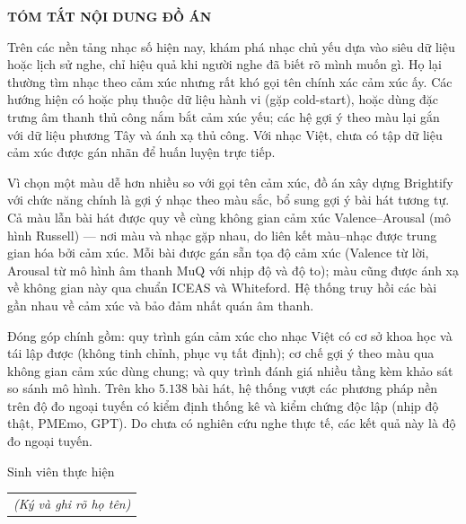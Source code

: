 \documentclass[../DoAn.tex]{subfiles}
\begin{document}
\begin{center}
    \Large{\textbf{TÓM TẮT NỘI DUNG ĐỒ ÁN}}\\
\end{center}
\vspace{1cm}

Trên các nền tảng nhạc số hiện nay, khám phá nhạc chủ yếu dựa vào siêu dữ liệu hoặc lịch sử nghe, chỉ hiệu quả khi người nghe đã biết rõ mình muốn gì. Họ lại thường tìm nhạc theo cảm xúc nhưng rất khó gọi tên chính xác cảm xúc ấy. Các hướng hiện có hoặc phụ thuộc dữ liệu hành vi (gặp cold-start), hoặc dùng đặc trưng âm thanh thủ công nắm bắt cảm xúc yếu; các hệ gợi ý theo màu lại gắn với dữ liệu phương Tây và ánh xạ thủ công. Với nhạc Việt, chưa có tập dữ liệu cảm xúc được gán nhãn để huấn luyện trực tiếp.

Vì chọn một màu dễ hơn nhiều so với gọi tên cảm xúc, đồ án xây dựng Brightify với chức năng chính là gợi ý nhạc theo màu sắc, bổ sung gợi ý bài hát tương tự. Cả màu lẫn bài hát được quy về cùng không gian cảm xúc Valence--Arousal (mô hình Russell) --- nơi màu và nhạc gặp nhau, do liên kết màu--nhạc được trung gian hóa bởi cảm xúc. Mỗi bài được gán sẵn tọa độ cảm xúc (Valence từ lời, Arousal từ mô hình âm thanh MuQ với nhịp độ và độ to); màu cũng được ánh xạ về không gian này qua chuẩn ICEAS và Whiteford. Hệ thống truy hồi các bài gần nhau về cảm xúc và bảo đảm nhất quán âm thanh.

Đóng góp chính gồm: quy trình gán cảm xúc cho nhạc Việt có cơ sở khoa học và tái lập được (không tinh chỉnh, phục vụ tất định); cơ chế gợi ý theo màu qua không gian cảm xúc dùng chung; và quy trình đánh giá nhiều tầng kèm khảo sát so sánh mô hình. Trên kho $5.138$ bài hát, hệ thống vượt các phương pháp nền trên độ đo ngoại tuyến có kiểm định thống kê và kiểm chứng độc lập (nhịp độ thật, PMEmo, GPT). Do chưa có nghiên cứu nghe thực tế, các kết quả này là độ đo ngoại tuyến.

\begin{flushright}
Sinh viên thực hiện\\
\begin{tabular}{@{}c@{}}
\textit{(Ký và ghi rõ họ tên)}
\end{tabular}
\end{flushright}
\end{document}
